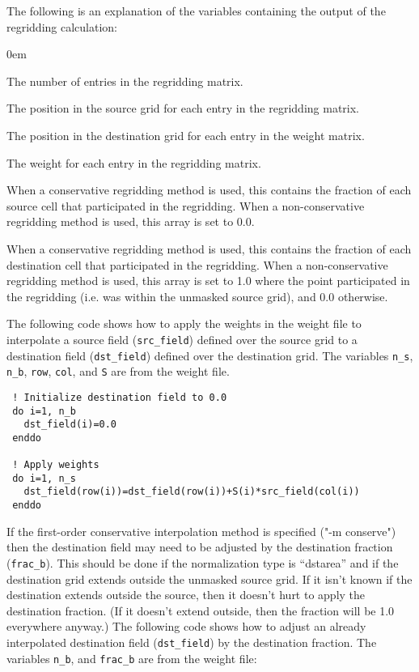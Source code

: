 The following is an explanation of the variables containing the output of the regridding calculation:
\begin{description}
  \itemsep0em
  \item[n\_s] The number of entries in the regridding matrix. 
  \item[col] The position in the source grid for each entry in the regridding matrix. 
  \item[row] The position in the destination grid for each entry in the weight matrix. 
  \item[S] The weight for each entry in the regridding matrix. 
  \item[frac\_a] When a conservative regridding method is used, this contains the fraction of each source cell that participated in the regridding. When a non-conservative regridding method is used, this array is set to 0.0.
  \item[frac\_b] When a conservative regridding method is used, this contains the fraction of each destination cell that participated in the regridding. When a non-conservative regridding method is used, this array is set to 1.0 where the point participated in the regridding (i.e. was within the unmasked source grid), and 0.0 otherwise. 
\end{description}

The following code shows how to apply the weights in the weight file to interpolate a source field ({\tt src\_field}) defined 
over the source grid to a destination field ({\tt dst\_field}) defined over the destination grid. The variables {\tt n\_s}, {\tt n\_b}, 
{\tt row}, {\tt col}, and {\tt S} are from the weight file. 

\begin{verbatim}
 ! Initialize destination field to 0.0
 do i=1, n_b
   dst_field(i)=0.0
 enddo

 ! Apply weights
 do i=1, n_s
   dst_field(row(i))=dst_field(row(i))+S(i)*src_field(col(i))
 enddo
\end{verbatim}

If the first-order conservative interpolation method is specified ("-m conserve") then the destination field may need to be adjusted by the destination fraction ({\tt frac\_b}). 
This should be done if the normalization type is ``dstarea'' and if the destination grid extends outside the unmasked source grid. If it isn't known if the destination extends outside the source, then it doesn't hurt to apply the destination fraction. (If it doesn't extend outside, then the fraction will be 1.0 everywhere anyway.) 
The following code shows how to adjust an already interpolated destination field ({\tt dst\_field}) by the destination fraction. The variables {\tt n\_b}, and {\tt frac\_b} are from the weight file:

